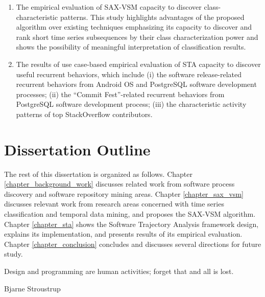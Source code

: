 \begin{enumerate}
\begin{enumerate}
 \item The empirical evaluation of SAX-VSM capacity to discover class-characteristic patterns. This study highlights advantages of the proposed algorithm over existing techniques emphasizing its capacity to discover and rank short time series subsequences by their class characterization power and shows the possibility of meaningful interpretation of classification results.

 \item The results of use case-based empirical evaluation of STA capacity to discover useful recurrent 
behaviors, which include 
(i) the software release-related recurrent behaviors from Android OS and PostgreSQL software development processes;
(ii) the ``Commit Fest''-related recurrent behaviors from PostgreSQL software development process; 
(iii) the characteristic activity patterns of top StackOverflow contributors.
\end{enumerate}

\end{enumerate}

\section{Dissertation Outline}\label{section_organization}
The rest of this dissertation is organized as follows. 
Chapter \ref{chapter_background_work} discusses related work from software process discovery and software repository mining areas.
Chapter \ref{chapter_sax_vsm} discusses relevant work from research areas concerned with time series classification and temporal data mining, and proposes the  SAX-VSM algorithm.
Chapter \ref{chapter_sta} shows the Software Trajectory Analysis framework design, explains its implementation, and presents results of its empirical evaluation. 
Chapter \ref{chapter_conclusion} concludes and discusses several directions for future study.

\epigraph{Design and programming are human activities; forget that and all is lost.}{Bjarne Stroustrup}